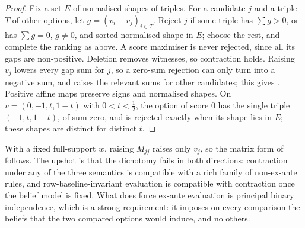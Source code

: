 \begin{proof}
Fix a set $E$ of normalised shapes of triples. For a candidate $j$ and a triple $T$ of other options,
let $g=(v_i-v_j)_{i\in T}$. Reject $j$ if some triple has $\sum g>0$, or has $\sum g=0$, $g\ne0$, and
sorted normalised shape in $E$; choose the rest, and complete the ranking as above. A score maximiser
is never rejected, since all its gaps are non-positive. Deletion removes witnesses, so contraction
holds. Raising $v_j$ lowers every gap sum for $j$, so a zero-sum rejection can only turn into a
negative sum, and raises the relevant sums for other candidates; this gives \Mon. Positive affine
maps preserve signs and normalised shapes. On $v=(0,-1,t,1-t)$ with $0<t<\tfrac12$, the option of
score $0$ has the single triple $(-1,t,1-t)$, of sum zero, and is rejected exactly when its shape lies
in $E$; these shapes are distinct for distinct $t$.
\end{proof}

With a fixed full-support $w$, raising $M_{jj}$ raises only $v_j$, so the matrix form of \Mon{} follows.
The upshot is that the dichotomy fails in both directions: contraction under any of the three
semantics is compatible with a rich family of non-ex-ante rules, and row-baseline-invariant
evaluation is compatible with contraction once the belief model is fixed. What does force ex-ante
evaluation is principal binary independence, which is a strong requirement: it imposes on every
comparison the beliefs that the two compared options would induce, and no others.

